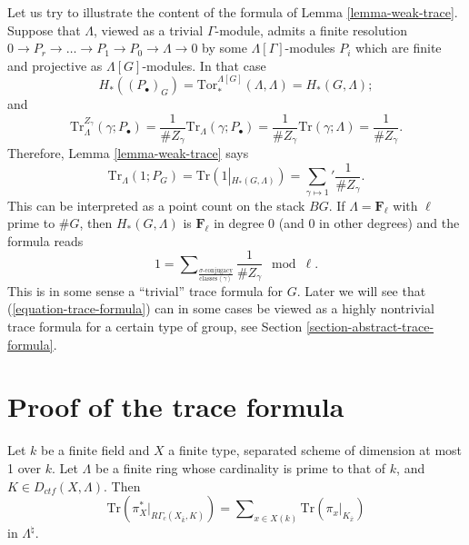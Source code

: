 \begin{remark}
\label{remark-content-trivial-trace}
Let us try to illustrate the content of the formula of
Lemma \ref{lemma-weak-trace}.
Suppose that $\Lambda$, viewed as a trivial $\Gamma$-module, admits a finite
resolution
$
0\to P_r\to \ldots \to P_1 \to P_0\to \Lambda\to 0
$
by some $\Lambda[\Gamma]$-modules $P_i$ which are finite and projective as
$\Lambda[G]$-modules. In that case
$$
H_*\left(\left(P_\bullet\right)_G\right) =
\text{Tor}_*^{\Lambda[G]}\left(\Lambda, \Lambda\right) = H_*(G, \Lambda) ;
$$
and
$$
\text{Tr}_\Lambda^{Z_\gamma}\left(\gamma; P_\bullet\right) =\frac{1}{\#
Z_\gamma}\text{Tr}_\Lambda(\gamma; P_\bullet)=\frac{1}{\#
Z_\gamma}\text{Tr}(\gamma;\Lambda) = \frac{1}{\# Z_\gamma}.
$$
Therefore, Lemma \ref{lemma-weak-trace} says
$$
\text{Tr}_\Lambda (1 ; P_G)
= \text{Tr}\left(1\left|_{H_*(G, \Lambda)}\right.\right)
= {\sum_{\gamma\mapsto1}}'\frac{1}{\# Z_\gamma}.
$$
This can be interpreted as a point count on the stack $BG$. If
$\Lambda = \mathbf{F}_\ell$ with $\ell$ prime to $\#G$, then
$H_*(G, \Lambda)$ is $\mathbf{F}_\ell$ in degree 0 (and $0$ in
other degrees) and the formula reads
$$
1 =
\sum\nolimits_{
\frac{\sigma\text{-conjugacy}}{\text{classes}\left<\gamma\right>}
}
\frac{1}{\# Z_\gamma} \mod{\ell}.
$$
This is in some sense a ``trivial'' trace formula for $G$.
Later we will see that (\ref{equation-trace-formula}) can in
some cases be viewed as a highly nontrivial trace formula for a
certain type of group, see
Section \ref{section-abstract-trace-formula}.
\end{remark}





\section{Proof of the trace formula}
\label{section-proof-trace-formula}

\begin{theorem}
\label{theorem-trace-formula-again}
Let $k$ be a finite field and $X$ a finite type, separated scheme of dimension
at most 1 over $k$. Let $\Lambda$ be a finite ring whose cardinality is prime
to that of $k$, and $K\in D_{ctf}(X, \Lambda)$. Then
\begin{equation}
\label{equation-trace-formula-again}
\text{Tr} \left(\pi_X^*\big|_{R\Gamma_c(X_{\bar k}, K)}\right)
=
\sum\nolimits_{x\in X(k)}
\text{Tr}\left(\pi_x\big|_{K_{\bar x}}\right)
\end{equation}
in $\Lambda^{\natural}$.
\end{theorem}

